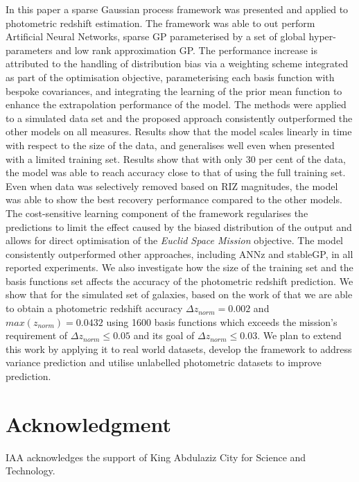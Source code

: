 \documentclass[useAMS,usenatbib,fleqn]{mn2e}
\begin{document}
In this paper a sparse Gaussian process framework was presented and applied to photometric redshift estimation. The framework was able to out perform Artificial Neural Networks, sparse GP parameterised by a set of global hyper-parameters and low rank approximation GP. The performance increase is attributed to the handling of distribution bias via a weighting scheme integrated as part of the optimisation objective, parameterising each basis function with bespoke covariances, and integrating the learning of the prior mean function to enhance the extrapolation performance of the model. The methods were applied to a simulated data set and the proposed approach consistently outperformed the other models on all measures. Results show that the model scales linearly in time with respect to the size of the data, and generalises well even when presented with a limited training set. Results show that with only 30 per cent of the data, the model was able to reach accuracy close to that of using the full training set. Even when data was selectively removed based on RIZ magnitudes, the model was able to show the best recovery performance compared to the other models. The cost-sensitive learning component of the framework regularises the predictions to limit the effect caused by the biased distribution of the output and allows for direct optimisation of the {\em Euclid Space Mission} objective. The model consistently outperformed other approaches, including ANNz and stableGP, in all reported experiments. We also investigate how the size of the training set and the basis functions set affects the accuracy of the photometric redshift prediction. We show that for the simulated set of galaxies, based on the work of \cite{jouvel09} that we are able to obtain a photometric redshift accuracy $\Delta z_{norm}  = 0.002$ and $max\left(z_{norm}\right)=0.0432$ using 1600 basis functions which exceeds the mission's requirement of $\Delta z_{norm} \le 0.05$ and its goal of $\Delta z_{norm} \le 0.03$. We plan to extend this work by applying it to real world datasets, develop the framework to address variance prediction and utilise unlabelled photometric datasets to improve prediction.

\section*{Acknowledgment }
IAA acknowledges the support of King Abdulaziz City for Science and Technology.

\footnotesize{


}

\label{lastpage}
\end{document}
